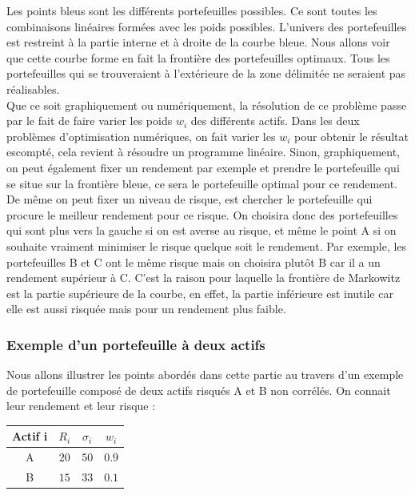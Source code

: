 Les points bleus sont les différents portefeuilles possibles. Ce sont toutes les combinaisons linéaires formées avec les poids possibles. L'univers des portefeuilles est restreint à la partie interne et à droite de la courbe bleue. Nous allons voir que cette courbe forme en fait la frontière des portefeuilles optimaux. Tous les portefeuilles qui se trouveraient à l'extérieure de la zone délimitée ne seraient pas réalisables.\\

Que ce soit graphiquement ou numériquement, la résolution de ce problème passe par le fait de faire varier les poids $w_i$ des différents actifs. Dans les deux problèmes d'optimisation numériques, on fait varier les $w_i$ pour obtenir le résultat escompté, cela revient à résoudre un programme linéaire.
Sinon, graphiquement, on peut également fixer un rendement par exemple et prendre le portefeuille qui se situe sur la frontière bleue, ce sera le portefeuille optimal pour ce rendement.\\

De même on peut fixer un niveau de risque, est chercher le portefeuille qui procure le meilleur rendement pour ce risque. On choisira donc des portefeuilles qui sont plus vers la gauche si on est averse au risque, et même le point A si on souhaite vraiment minimiser le risque quelque soit le rendement.
Par exemple, les portefeuilles B et C ont le même risque mais on choisira plutôt B car il a un rendement supérieur à C. C'est la raison pour laquelle la frontière de Markowitz est la partie supérieure de la courbe, en effet, la partie inférieure est inutile car elle est aussi risquée mais pour un rendement plus faible.



\subsubsection{Exemple d'un portefeuille à deux actifs}
Nous allons illustrer les points abordés dans cette partie au travers d'un exemple de portefeuille composé de deux actifs risqués A et B non corrélés. On connait leur rendement et leur risque :
\begin{center}
  \begin{tabular}{|c|c|c|c|}
    \hline
    Actif i & $R_i$ & $\sigma_i$ & $w_i$ \\  \hline
    A	& $20$ & $50$ & $0.9$\\   \hline
    B	& $15$ & $33$ & $0.1$\\
    \hline
  \end{tabular}
\end{center}

